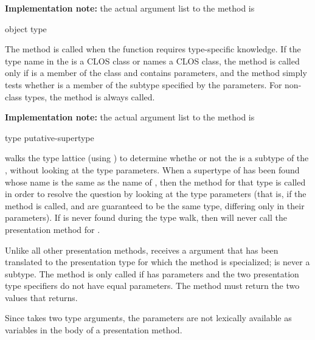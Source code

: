 {\bf Implementation note:} the actual argument list to the
 method is
\\


 {object type}

The  method is called when the 
function requires type-specific knowledge.  If the type name in the
  is a CLOS class or names a CLOS class, the
method is called only if  is a member of the class and 
contains parameters, and the method simply tests whether  is a
member of the subtype specified by the parameters.  For non-class types, the
method is always called.

{\bf Implementation note:} the actual argument list to the 
method is
\\


 {type putative-supertype}

 walks the type lattice (using
) to determine whethe or not the
  is a subtype of the
, without looking at the type parameters.  When a
supertype of  has been found whose name is the same as the name of
, then the  method for that type is called
in order to resolve the question by looking at the type parameters (that is, if
the  method is called,  and  are
guaranteed to be the same type, differing only in their parameters).  If
 is never found during the type walk, then
 will never call the 
presentation method for .

Unlike all other presentation methods,  receives a
 argument that has been translated to the presentation type for which
the method is specialized;  is never a subtype.  The method is only
called if  has parameters and the two presentation type
specifiers do not have equal parameters.  The method must return the two values
that  returns.

Since  takes two type arguments, the parameters are
not lexically available as variables in the body of a presentation method.


